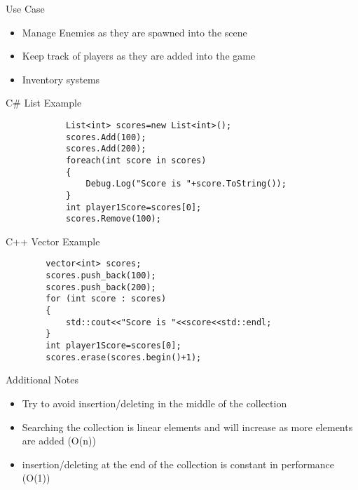\begin{frame}{Use Case}
	\begin{itemize}
		\pause \item Manage Enemies as they are spawned into the scene
		\pause \item Keep track of players as they are added into the game
		\pause \item Inventory systems 
	\end{itemize}
\end{frame}

\begin{frame}[fragile]{C\# List
	 Example}
			\begin{lstlisting}
			List<int> scores=new List<int>();
			scores.Add(100);
			scores.Add(200);
			foreach(int score in scores)
			{
				Debug.Log("Score is "+score.ToString());
			}
			int player1Score=scores[0];
			scores.Remove(100);
			\end{lstlisting}
\end{frame}

\begin{frame}[fragile]{C++ Vector
	Example}
	\begin{lstlisting}
		vector<int> scores;
		scores.push_back(100);
		scores.push_back(200);
		for (int score : scores)
		{
			std::cout<<"Score is "<<score<<std::endl;
		}
		int player1Score=scores[0];
		scores.erase(scores.begin()+1);
	\end{lstlisting}
\end{frame}

\begin{frame}{Additional Notes}
	\begin{itemize}
		\pause \item Try to avoid insertion/deleting in the middle of the collection
		\pause \item Searching the collection is linear elements and will increase as more elements are added (O(n))
		\pause \item insertion/deleting at the end of the collection is constant in performance (O(1)) 
	\end{itemize}
\end{frame}
